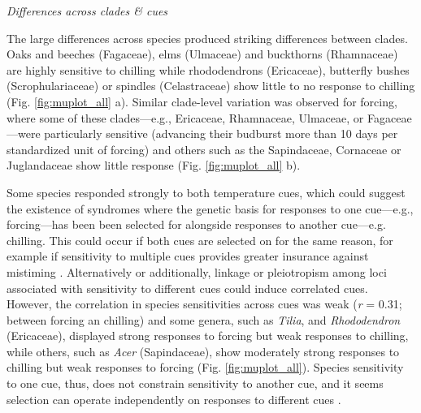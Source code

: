 \documentclass[11pt]{article}
\begin{document}
\emph{Differences across clades \& cues}

The large differences across species produced striking differences between clades. Oaks and beeches (Fagaceae), elms (Ulmaceae) and buckthorns (Rhamnaceae) are highly sensitive to chilling while rhododendrons (Ericaceae), butterfly bushes (Scrophulariaceae) or spindles (Celastraceae) show little to no response to chilling (Fig. \ref{fig:muplot_all} a). %
Similar clade-level variation was observed for forcing, where some of these clades---e.g., Ericaceae, Rhamnaceae, Ulmaceae, or Fagaceae---were particularly sensitive (advancing their budburst more than 10 days per standardized unit of forcing) and others such as the Sapindaceae, Cornaceae or Juglandaceae show little response (Fig. \ref{fig:muplot_all} b). %

Some species responded strongly to both temperature cues, which could suggest the existence of syndromes where the genetic basis for responses to one cue---e.g., forcing---has been been selected for alongside responses to another cue---e.g. chilling. This could occur if both cues are selected on for the same reason, for example if sensitivity to multiple cues provides greater insurance against mistiming \citep{bonamour2019,memegan2021}. Alternatively or additionally, linkage or pleiotropism among loci associated with sensitivity to different cues \citep{nakagawa2005} could induce correlated cues. However, the correlation in species sensitivities across cues was weak (\emph{r} = 0.31; between forcing an chilling) and some genera, such as \emph{Tilia}, and \emph{Rhododendron} (Ericaceae), displayed strong responses to forcing but weak responses to chilling, while others, such as \emph{Acer} (Sapindaceae), show moderately strong responses to chilling but weak responses to forcing (Fig. \ref{fig:muplot_all}). Species sensitivity to one cue, thus, does not constrain sensitivity to another cue, and it seems selection can operate independently on responses to different cues \citep{bonamour2019}.
\end{document}
